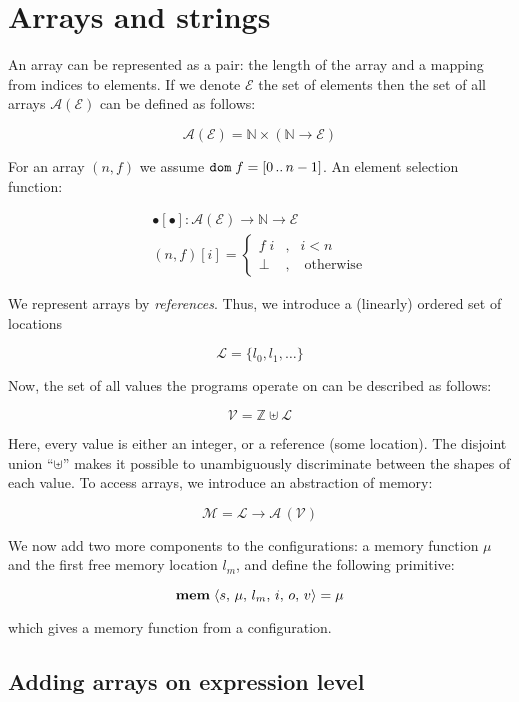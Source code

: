 \section{Arrays and strings}

An array can be represented as a pair: the length of the array and a mapping from indices to elements. If we denote
$\mathscr E$ the set of elements then the set of all arrays $\mathscr A (\mathscr E)$ can be defined as follows:

\[
\mathscr A(\mathscr E) = \mathbb N \times (\mathbb N \to \mathscr E)
\]

For an array $(n, f)$ we assume $\mathtt{dom}\;{f}=[0\,..\,n-1]$. An element selection function:

\[
\begin{array}{c}
  \bullet[\bullet] : \mathscr A (\mathscr E) \to \mathbb N \to \mathscr E\\[2mm]
  (n, f) [i] = \left\{
                  \begin{array}{rcl}
                     f\;i &, & i < n\\
                     \bot&,&\;\mbox{otherwise}
                  \end{array}
               \right.
\end{array}
\]

We represent arrays by \emph{references}. Thus, we introduce a (linearly) ordered set of locations

\[
\mathscr L = \{l_0, l_1, \dots\}
\]

Now, the set of all values the programs operate on can be described as follows:

\[
    \mathscr V = \mathbb Z \uplus \mathscr L 
\]

Here, every value is either an integer, or a reference (some location). The disjoint union ``$\uplus$'' makes it possible to
unambiguously discriminate between the shapes of each value. To access arrays, we introduce an abstraction of memory:


\[
    \mathscr M = \mathscr L \to \mathscr A\,(\mathscr V)
\]

We now add two more components to the configurations: a memory function $\mu$ and the first free memory location $l_m$, and
define the following primitive:

\[
\mathbf{mem}\;{\left<{s,\,\mu,\,l_m,\,i,\,o,\,v}\right>}=\mu
\]

which gives a memory function from a configuration.

\subsection{Adding arrays on expression level}

